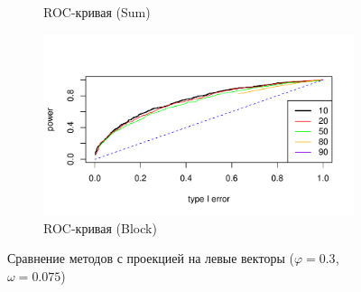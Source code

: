 \documentclass[specialist,
substylefile = spbu_report.rtx,
subf,href,colorlinks=true, 12pt]{disser}
\theoremstyle{definition}
\begin{document}
\begin{figure}[h!]
\begin{subfigure}[t]{0.5\textwidth}
		\caption{ROC-кривая (Sum)}
	\end{subfigure}\hspace{\fill}
	\begin{subfigure}[t]{0.5\textwidth}
		\centering
		\includegraphics[width=\textwidth]{img/roc_block_ev_phi3_omega0075.pdf}
		\caption{ROC-кривая (Block)}
	\end{subfigure}
	\caption{Сравнение методов с проекцией на левые векторы ($\varphi=0.3$, $\omega=0.075$)}
	\label{fig:sum_block_ev_phi3}
\end{figure}
\end{document}
